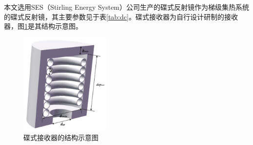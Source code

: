 本文选用SES（Stirling Energy System）公司生产的碟式反射镜作为梯级集热系统的碟式反射镜，其主要参数见于表\ref{tab:dc}。碟式接收器为自行设计研制的接收器，图\ref{fig:dishReceiver}是其结构示意图。

\begin{figure}[!ht]
\centering
\includegraphics[width=0.4\textwidth]{fig/DishReceiver.pdf}
\caption{碟式接收器的结构示意图}\label{fig:dishReceiver}
\end{figure}

